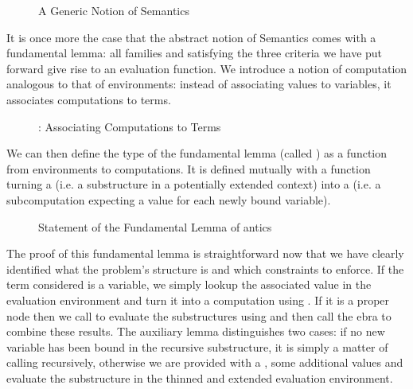 \begin{figure}[h]
\begin{minipage}{0.35\textwidth}
\end{minipage}\hspace{2em}
\begin{minipage}{0.55\textwidth}
\end{minipage}
\caption{A Generic Notion of Semantics}
\end{figure}

It is once more the case that the abstract notion of Semantics comes
with a fundamental lemma: all  families  and
 satisfying the three criteria we have put forward give rise
to an evaluation function. We introduce a notion of computation
 analogous to that of environments: instead of associating
values to variables, it associates computations to terms.

\begin{figure}[h]
\caption{: Associating Computations to Terms}
\end{figure}

We can then define the type of the fundamental lemma (called ) as
a function from environments to computations. It is defined mutually with a
function  turning a  (i.e. a substructure in a
potentially extended context) into a  (i.e. a subcomputation
expecting a value for each newly bound variable).

\begin{figure}
\caption{Statement of the Fundamental Lemma of antics}
\end{figure}

The proof  of this fundamental lemma is straightforward now
that we have clearly identified what the problem's structure is and
which constraints to enforce. If the term considered is a variable,
we simply lookup the associated value in the evaluation environment
and turn it into a computation using . If it is a proper
node then we call  to evaluate the substructures using
 and then call the ebra to combine these results.
The auxiliary lemma  distinguishes two cases: if no new
variable has been bound in the recursive substructure, it is simply
a matter of calling  recursively, otherwise we are provided
with a , some additional values and evaluate the
substructure in the thinned and extended evaluation environment.


